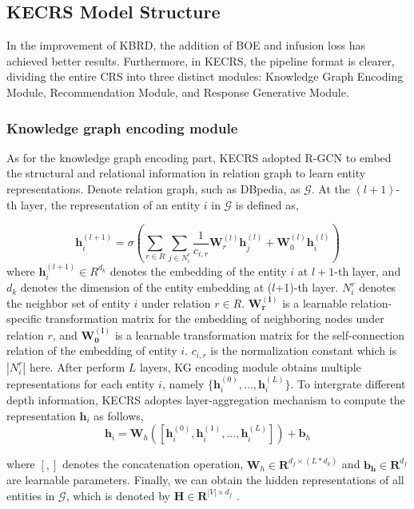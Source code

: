 \documentclass[11pt]{article}
\begin{document}
\subsection{KECRS Model Structure}
In the improvement of KBRD, the addition of BOE and infusion loss has achieved better results. Furthermore, in KECRS, the pipeline format is clearer, dividing the entire CRS into three distinct modules: Knowledge Graph Encoding Module, Recommendation Module, and Response Generative Module.
\subsubsection{Knowledge graph encoding module}
As for the knowledge graph encoding part, KECRS adopted R-GCN \citet{schlichtkrull2018modeling} to embed the structural and relational information in relation graph to learn entity representations. Denote relation graph, such as DBpedia, as $\mathcal{G}$. At the $(l+1)$-th layer, the representation of an entity $i$ in $\mathcal{G}$ is defined as,

\begin{equation}
    \mathbf{h}_i^{(l+1)} = \sigma(\sum_{r\in R}\sum_{j \in N_i^r} \frac{1}{c_{i,r}}\mathbf{W}_r^{(l)}\mathbf{h}_j^{(l)} + \mathbf{W}_0^{(l)}\mathbf{h}_i^{(l)})
\end{equation}
where $\mathbf{h}_i^{(l+1)} \in R^{d_k}$  denotes the embedding of the entity $i$ at $l+1$-th layer, and $d_k$ denotes the dimension of the entity embedding at ($l$+1)-th layer. $N_i^r$ denotes the neighbor set of entity $i$ under relation $r \in R$. $\mathbf{W_r^{(l)}}$ is a learnable relation-specific transformation matrix for the embedding of neighboring nodes under relation $r$, and $\mathbf{W_0^{(l)}}$ is a learnable transformation matrix for the self-connection relation of the embedding of entity $i$. $c_{i,r}$ is the normalization constant which is $|N_i^r|$ here. After perform $L$ layers, KG encoding module obtains multiple representations for each entity $i$, namely $\{\mathbf{h}_i^{(0)},..., \mathbf{h}_i^{(L)}\}$. To intergrate different depth information, KECRS adoptes layer-aggregation mechanism to compute the representation $\mathbf{h}_i$ as follows,
\begin{equation}
    \mathbf{h}_i = \mathbf{W}_h([\mathbf{h}_i^{(0)}, \mathbf{h}_i^{(1)}, ...,\mathbf{h}_i^{(L)}]) + \mathbf{b}_h
\end{equation}

where $[,]$ denotes the concatenation operation, $\mathbf{W}_h \in \mathbf{R}^{d_f\times (L*d_k)}$ and $\mathbf{b_h} \in \mathbf{R}^{d_f} $ are learnable parameters. Finally, we can obtain the hidden representations of all entities in $\mathcal{G}$, which is denoted by $\mathbf{H}\in \mathbf{R}^{|V|\times d_f}$ .
\end{document}
